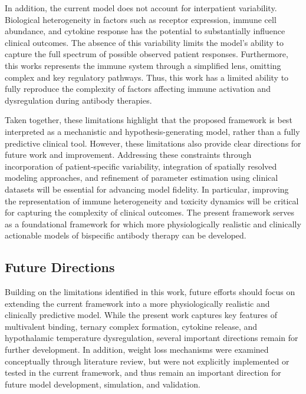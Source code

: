 \documentclass[11pt]{article}
\begin{document}
In addition, the current model does not account for interpatient variability. Biological heterogeneity in factors such as receptor expression, immune cell abundance, and cytokine response has the potential to substantially influence clinical outcomes. The absence of this variability limits the model’s ability to capture the full spectrum of possible observed patient responses. Furthermore, this works represents the immune system through a simplified lens, omitting complex and key regulatory pathways. Thus, this work has a limited ability to fully reproduce the complexity of factors affecting immune activation and dysregulation during antibody therapies.
\par\medskip

Taken together, these limitations highlight that the proposed framework is best interpreted as a mechanistic and hypothesis-generating model, rather than a fully predictive clinical tool. However, these limitations also provide clear directions for future work and improvement. Addressing these constraints through incorporation of patient-specific variability, integration of spatially resolved modeling approaches, and refinement of parameter estimation using clinical datasets will be essential for advancing model fidelity. In particular, improving the representation of immune heterogeneity and toxicity dynamics will be critical for capturing the complexity of clinical outcomes. The present framework serves as a foundational framework for which more physiologically realistic and clinically actionable models of bispecific antibody therapy can be developed.
\par\medskip

\subsection{Future Directions}

Building on the limitations identified in this work, future efforts should focus on extending the current framework into a more physiologically realistic and clinically predictive model. While the present work captures key features of multivalent binding, ternary complex formation, cytokine release, and hypothalamic temperature dysregulation, several important directions remain for further development. In addition, weight loss mechanisms were examined conceptually through literature review, but were not explicitly implemented or tested in the current framework, and thus remain an important direction for future model development, simulation, and validation.
\par\medskip
\end{document}
